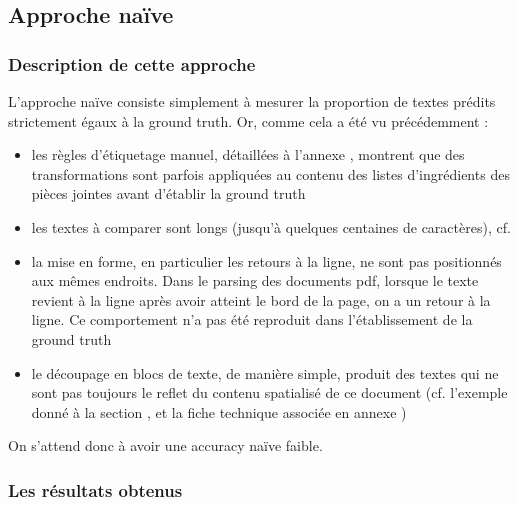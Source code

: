            \subsection{Approche naïve}

                \subsubsection{Description de cette approche}

                L'approche \og naïve \fg consiste simplement à mesurer la proportion de textes prédits strictement égaux à la ground truth.
                Or, comme cela a été vu précédemment : 
                \begin{itemize}
                    \item les règles d'étiquetage manuel, détaillées à l'annexe , montrent que des transformations sont parfois appliquées au contenu des listes d'ingrédients des pièces jointes avant d'établir la ground truth
                    \item les textes à comparer sont longs (jusqu'à quelques centaines de caractères), cf. 
                    \item la mise en forme, en particulier les retours à la ligne, ne sont pas positionnés aux mêmes endroits. Dans le parsing des documents pdf, lorsque le texte revient à la ligne après avoir atteint le bord de la page, on a un retour à la ligne. Ce comportement n'a pas été reproduit dans l'établissement de la ground truth
                    \item le découpage en blocs de texte, de manière simple, produit des textes qui ne sont pas toujours le reflet du contenu spatialisé de ce document (cf. l'exemple donné à la section , et la fiche technique associée en annexe )
                \end{itemize}
                On s'attend donc à avoir une \og accuracy naïve \fg faible.

                \subsubsection{Les résultats obtenus}

